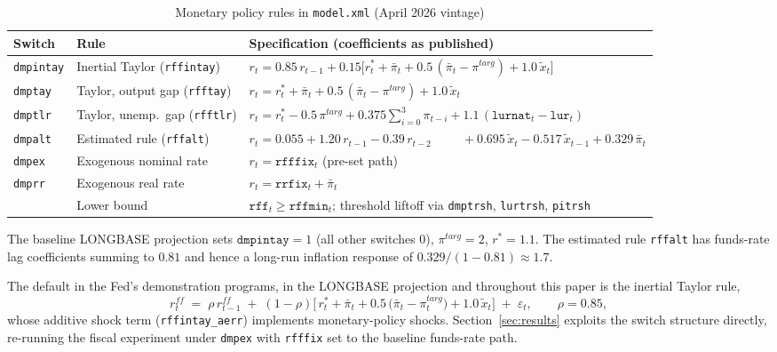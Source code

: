 \begin{table}[htbp]
\centering
\caption{Monetary policy rules in \texttt{model.xml} (April 2026 vintage)}
\label{tab:rules}
\small
\begin{tabular}{llp{8.2cm}}
\toprule
Switch & Rule & Specification (coefficients as published) \\
\midrule
\texttt{dmpintay} & Inertial Taylor (\texttt{rffintay}) & $r_t = 0.85\,r_{t-1} + 0.15\big[r^{*}_t+\bar\pi_t+0.5\,(\bar\pi_t-\pi^{targ})+1.0\,\tilde x_t\big]$ \\[3pt]
\texttt{dmptay} & Taylor, output gap (\texttt{rfftay}) & $r_t = r^{*}_t+\bar\pi_t+0.5\,(\bar\pi_t-\pi^{targ})+1.0\,\tilde x_t$ \\[3pt]
\texttt{dmptlr} & Taylor, unemp.\ gap (\texttt{rfftlr}) & $r_t = r^{*}_t-0.5\,\pi^{targ}+0.375\sum_{i=0}^{3}\pi_{t-i}+1.1\,(\texttt{lurnat}_t-\texttt{lur}_t)$ \\[3pt]
\texttt{dmpalt} & Estimated rule (\texttt{rffalt}) & $r_t = 0.055+1.20\,r_{t-1}-0.39\,r_{t-2}$ \newline $\phantom{r_t = }+0.695\,\tilde x_t-0.517\,\tilde x_{t-1}+0.329\,\bar\pi_t$ \\[3pt]
\texttt{dmpex} & Exogenous nominal rate & $r_t = \texttt{rfffix}_t$ (pre-set path) \\[3pt]
\texttt{dmprr} & Exogenous real rate & $r_t = \texttt{rrfix}_t + \bar\pi_t$ \\
\midrule
 & Lower bound & $\texttt{rff}_t \ge \texttt{rffmin}_t$; threshold liftoff via \texttt{dmptrsh}, \texttt{lurtrsh}, \texttt{pitrsh} \\
\bottomrule
\end{tabular}

\medskip
\parbox{0.95\textwidth}{\footnotesize The baseline LONGBASE projection sets $\texttt{dmpintay}=1$ (all other switches 0), $\pi^{targ}=2$, $r^{*}=1.1$. The estimated rule \texttt{rffalt} has funds-rate lag coefficients summing to $0.81$ and hence a long-run inflation response of $0.329/(1-0.81)\approx 1.7$.}
\end{table}

The default in the Fed's demonstration programs, in the LONGBASE projection and throughout this paper is the inertial Taylor rule,
\begin{equation}
r^{ff}_t \;=\; \rho\, r^{ff}_{t-1} \;+\; (1-\rho)\Big[\, r^{*}_t + \bar\pi_t + 0.5\,\big(\bar\pi_t - \pi^{targ}_t\big) + 1.0\, \tilde x_t \Big] \;+\; \varepsilon_t,
\qquad \rho = 0.85,
\label{eq:taylor}
\end{equation}
whose additive shock term (\texttt{rffintay\_aerr}) implements monetary-policy shocks. Section~\ref{sec:results} exploits the switch structure directly, re-running the fiscal experiment under \texttt{dmpex} with \texttt{rfffix} set to the baseline funds-rate path.

